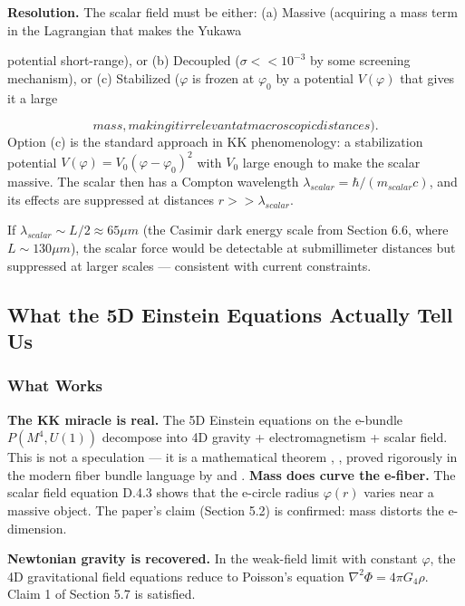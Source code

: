 \documentclass[aps,prd,preprint,superscriptaddress,longbibliography,floatfix]{revtex4-2}
\theoremstyle{remark}
\begin{document}
\textbf{Resolution.} The scalar field must be either: (a) Massive (acquiring a mass term in the Lagrangian that makes the Yukawa

potential short-range), or
(b) Decoupled ($\sigma << 10^{-3}$ by some screening mechanism), or (c) Stabilized ($\varphi$ is frozen at $\varphi_{0}$ by a potential $V(\varphi)$ that gives it a large

\begin{equation}
    mass, making it irrelevant at macroscopic distances).
\end{equation}
Option (c) is the standard approach in KK phenomenology: a stabilization potential $V(\varphi) = V_{0}(\varphi - \varphi_{0})^{2}$ with $V_{0}$ large enough to make the scalar massive. The scalar then has a Compton wavelength $\lambda_{scalar} = \hbar/(m_{scalar} c)$, and its effects are suppressed at distances $r >> \lambda_{scalar}$.

If $\lambda_{scalar} \sim L/2 \approx 65 \mu m$ (the Casimir dark energy scale from Section 6.6, where $L \sim  130 \mu m$), the scalar force would be detectable at submillimeter distances but suppressed at larger scales --- consistent with current constraints.



\subsection{What the 5D Einstein Equations Actually Tell Us}


\subsubsection{What Works}

\textbf{The KK miracle is real.} The 5D Einstein equations on the e-bundle $P(M^{4}, U(1))$ decompose into 4D gravity + electromagnetism + scalar field. This is not a speculation --- it is a mathematical theorem \cite{Kaluza1921}, \cite{Klein1926}, proved rigorously in the modern fiber bundle language by \cite{Cho1975} and \cite{BailinLove1987}.
\textbf{Mass does curve the e-fiber.} The scalar field equation D.4.3 shows that the e-circle radius $\varphi(r)$ varies near a massive object. The paper's claim (Section 5.2) is confirmed: mass distorts the e-dimension.

\textbf{Newtonian gravity is recovered.} In the weak-field limit with constant $\varphi$, the 4D gravitational field equations reduce to Poisson's equation $\nabla^{2}\Phi = 4\pi G_{4}\rho$. Claim 1 of Section 5.7 is satisfied.
\end{document}
